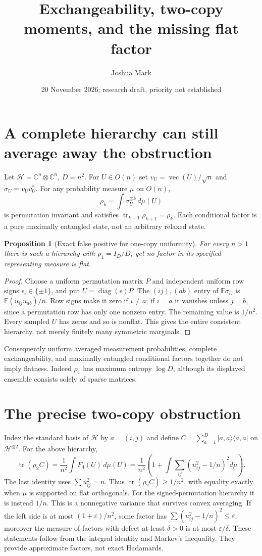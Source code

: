 \documentclass[11pt]{article}
\title{Exchangeability, two-copy moments, and the missing flat factor}
\author{Joshua Mark}
\date{20 November 2026; research draft, priority not established}
\newtheorem{proposition}[theorem]{Proposition}
\newcommand{\tr}{\operatorname{tr}}
\begin{document}
\maketitle
\section{A complete hierarchy can still average away the obstruction}
Let $\mathcal H=\mathbb C^n\otimes\mathbb C^n$, $D=n^2$.
For $U\in O(n)$ set $v_U=\operatorname{vec}(U)/\sqrt n$ and
$\sigma_U=v_Uv_U^*$. For any probability measure $\mu$ on $O(n)$,
\[
 \rho_k=\int\sigma_U^{\otimes k}\,d\mu(U)
\]
is permutation invariant and satisfies $\tr_{k+1}\rho_{k+1}=\rho_k$.
Each conditional factor is a pure maximally entangled state, not an
arbitrary relaxed state.
\begin{proposition}[Exact false positive for one-copy uniformity]
For every $n>1$ there is such a hierarchy with $\rho_1=I_D/D$,
yet no factor in its specified representing measure is flat.
\end{proposition}
\begin{proof}
Choose a uniform permutation matrix $P$ and independent uniform row
signs $\epsilon_i\in\{\pm1\}$, and put $U=\operatorname{diag}(\epsilon)P$.
The $(ij),(ab)$ entry of $\mathbb E\sigma_U$ is
$\mathbb E(u_{ij}u_{ab})/n$. Row signs make it zero if $i\ne a$;
if $i=a$ it vanishes unless $j=b$, since a permutation row has only
one nonzero entry. The remaining value is $1/n^2$. Every sampled
$U$ has zeros and so is nonflat. This gives the entire consistent
hierarchy, not merely finitely many symmetric marginals.
\end{proof}
Consequently uniform averaged measurement probabilities, complete
exchangeability, and maximally entangled conditional factors together
do not imply flatness. Indeed $\rho_1$ has maximum entropy $\log D$,
although its displayed ensemble consists solely of sparse matrices.

\section{The precise two-copy obstruction}
Index the standard basis of $\mathcal H$ by $a=(i,j)$ and define
$C=\sum_{a=1}^D |a,a\rangle\langle a,a|$ on $\mathcal H^{\otimes2}$.
For the above hierarchy,
\begin{equation}\label{coincidence}
 \tr(\rho_2 C)=\frac1{n^2}\int F_4(U)\,d\mu(U)
 =\frac1{n^2}\left(1+\int\sum_{ij}(u_{ij}^2-1/n)^2d\mu\right).
\end{equation}
The last identity uses $\sum u_{ij}^2=n$. Thus $\tr(\rho_2C)\ge1/n^2$,
with equality exactly when $\mu$ is supported on flat orthogonals.
For the signed-permutation hierarchy it is instead $1/n$.
This is a nonnegative variance that survives convex averaging.
If the left side is at most $(1+\varepsilon)/n^2$, some factor has
$\sum(u_{ij}^2-1/n)^2\le\varepsilon$; moreover the measure of factors
with defect at least $\delta>0$ is at most $\varepsilon/\delta$.
These statements follow from the integral identity and Markov's
inequality. They provide approximate factors, not exact Hadamards.
\end{document}

